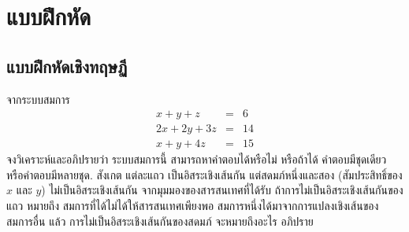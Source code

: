 \section{แบบฝึกหัด}

\subsection{แบบฝึกหัดเชิงทฤษฏี}

\begin{Parallel}[c]{0.55\textwidth}{0.36\textwidth}
\end{Parallel}


\begin{Exercise}
	\label{ex: lin alg lin equation nxn repeat column}

จากระบบสมการ
\begin{eqnarray}
x + y + z &=& 6 
\label{eq: lin alg exercise singular 1} \\
2 x + 2 y + 3 z &=& 14
\label{eq: lin alg exercise singular 2} \\
x + y + 4z &=& 15
\label{eq: lin alg exercise singular 3}
\end{eqnarray}
จงวิเคราะห์และอภิปรายว่า
ระบบสมการนี้ สามารถหาคำตอบได้หรือไม่ 
หรือถ้าได้
คำตอบมีชุดเดียว
หรือคำตอบมีหลายชุด.
สังเกต
แต่ละแถว เป็นอิสระเชิงเส้นกัน
แต่สดมภ์หนึ่งและสอง (สัมประสิทธิ์ของ $x$ และ $y$)
ไม่เป็นอิสระเชิงเส้นกัน
จากมุมมองของสารสนเทศที่ได้รับ
ถ้าการไม่เป็นอิสระเชิงเส้นกันของแถว
หมายถึง สมการที่ได้ไม่ได้ให้สารสนเทศเพียงพอ
สมการหนึ่งได้มาจากการแปลงเชิงเส้นของสมการอื่น
แล้ว
การไม่เป็นอิสระเชิงเส้นกันของสดมภ์
จะหมายถึงอะไร อภิปราย

\end{Exercise}

